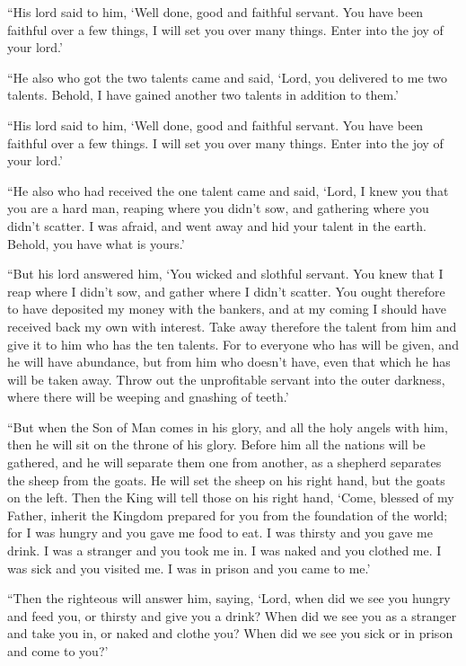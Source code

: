  ``His lord said to him, `Well done, good and faithful
servant. You have been faithful over a few things, I will set you over
many things. Enter into the joy of your lord.'

 ``He also who got the two talents came and said, `Lord,
you delivered to me two talents. Behold, I have gained another two
talents in addition to them.'

 ``His lord said to him, `Well done, good and faithful
servant. You have been faithful over a few things. I will set you over
many things. Enter into the joy of your lord.'

 ``He also who had received the one talent came and said,
`Lord, I knew you that you are a hard man, reaping where you didn't sow,
and gathering where you didn't scatter.  I was afraid, and
went away and hid your talent in the earth. Behold, you have what is
yours.'

 ``But his lord answered him, `You wicked and slothful
servant. You knew that I reap where I didn't sow, and gather where I
didn't scatter.  You ought therefore to have deposited my
money with the bankers, and at my coming I should have received back my
own with interest.  Take away therefore the talent from him
and give it to him who has the ten talents.  For to
everyone who has will be given, and he will have abundance, but from him
who doesn't have, even that which he has will be taken away.
 Throw out the unprofitable servant into the outer
darkness, where there will be weeping and gnashing of teeth.'

 ``But when the Son of Man comes in his glory, and all the
holy angels with him, then he will sit on the throne of his glory.
 Before him all the nations will be gathered, and he will
separate them one from another, as a shepherd separates the sheep from
the goats.  He will set the sheep on his right hand, but
the goats on the left.  Then the King will tell those on
his right hand, `Come, blessed of my Father, inherit the Kingdom
prepared for you from the foundation of the world;  for I
was hungry and you gave me food to eat. I was thirsty and you gave me
drink. I was a stranger and you took me in.  I was naked
and you clothed me. I was sick and you visited me. I was in prison and
you came to me.'

 ``Then the righteous will answer him, saying, `Lord, when
did we see you hungry and feed you, or thirsty and give you a drink?
 When did we see you as a stranger and take you in, or
naked and clothe you?  When did we see you sick or in
prison and come to you?'


